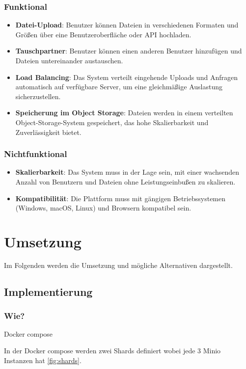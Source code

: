 \documentclass[12pt]{report}
\begin{document}
		\subsection{Funktional}
			\begin{itemize}
				\item \textbf{Datei-Upload}: Benutzer können Dateien in verschiedenen Formaten und Größen über eine Benutzeroberfläche oder API hochladen.
				\item \textbf{Tauschpartner}: Benutzer können einen anderen Benutzer hinzufügen und Dateien untereinander austauschen.
				\item \textbf{Load Balancing}: Das System verteilt eingehende Uploads und Anfragen automatisch auf verfügbare Server, um eine gleichmäßige Auslastung sicherzustellen.
				\item \textbf{Speicherung im Object Storage}: Dateien werden in einem verteilten Object-Storage-System gespeichert, das hohe Skalierbarkeit und Zuverlässigkeit bietet.
			\end{itemize}
		\subsection{Nichtfunktional}
			\begin{itemize}
				\item \textbf{Skalierbarkeit}: Das System muss in der Lage sein, mit einer wachsenden Anzahl von Benutzern und Dateien ohne Leistungseinbußen zu skalieren.
				\item \textbf{Kompatibilität}: Die Plattform muss mit gängigen Betriebssystemen (Windows, macOS, Linux) und Browsern kompatibel sein.
			\end{itemize}

\chapter{Umsetzung}
	Im Folgenden werden die Umsetzung und mögliche Alternativen dargestellt.
	\section{Implementierung}
		\subsection{Wie?}
			Docker compose 
			
			In der Docker compose werden zwei Shards definiert wobei jede 3 Minio Instanzen hat \ref{fig:shards}. 
		
\end{document}
